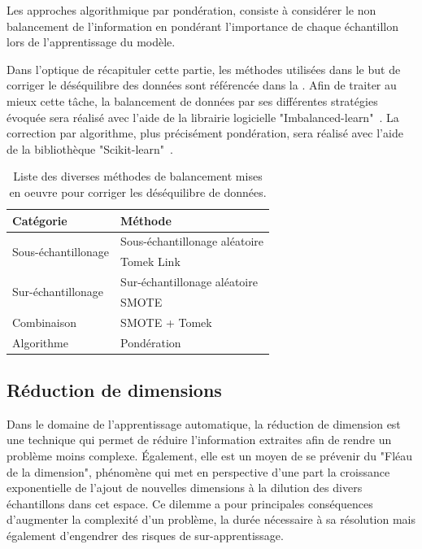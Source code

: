 Les approches algorithmique par pondération, consiste à considérer le non balancement de l'information en pondérant l'importance de chaque échantillon lors de l'apprentissage du modèle.  

Dans l'optique de récapituler cette partie, les méthodes utilisées dans le but de corriger le déséquilibre des données sont référencée dans la . Afin de traiter au mieux cette tâche, la balancement de données par ses différentes stratégies évoquée sera réalisé avec l'aide de la librairie logicielle "Imbalanced-learn"~\cite{Lemaitre2017}. La correction par algorithme, plus précisément pondération, sera réalisé avec l'aide de la bibliothèque "Scikit-learn"~\cite{pedregosa2011}.\par

\begin{table}[H]
    \centering
    \begin{tabular*}{0.6\linewidth}{l@{\extracolsep{\fill}}l}
    \toprule
    \textbf{Catégorie}                  & \textbf{Méthode}                  \\ \hline
    \multirow{2}{*}{Sous-échantillonage}& Sous-échantillonage aléatoire     \\ \cline{2-2}
                                        & Tomek Link                        \\ \hline
    \multirow{2}{*}{Sur-échantillonage} & Sur-échantillonage aléatoire      \\ \cline{2-2}
                                        & SMOTE                             \\ \hline
    Combinaison                         & SMOTE + Tomek                     \\ \hline 
    Algorithme                          & Pondération                       \\
    \bottomrule
    \end{tabular*}
    \caption{Liste des diverses méthodes de balancement mises en oeuvre pour corriger les déséquilibre de données.}
    \label{tab:summary_balancement_methods}
\end{table}\par

\subsection{Réduction de dimensions}
Dans le domaine de l'apprentissage automatique, la réduction de dimension est une technique qui permet de réduire l'information extraites afin de rendre un problème moins complexe. Également, elle est un moyen de se prévenir du "Fléau de la dimension", phénomène qui met en perspective d'une part la croissance exponentielle de l'ajout de nouvelles dimensions à la dilution des divers échantillons dans cet espace. Ce dilemme a pour principales conséquences d'augmenter la complexité d'un problème, la durée nécessaire à sa résolution mais également d'engendrer des risques de sur-apprentissage.\par

